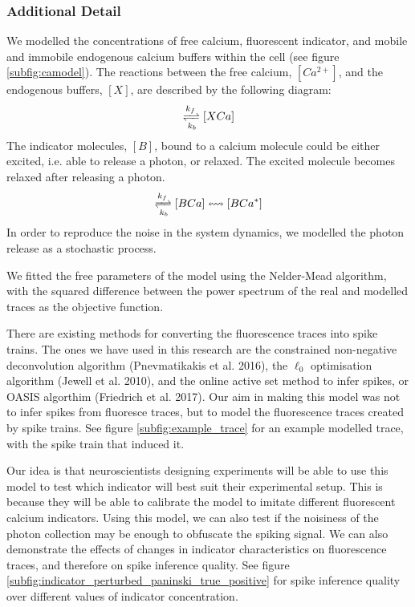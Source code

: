 \documentclass[a4paper,12pt]{article}
\theoremstyle{definition}
\begin{document}

\subsubsection*{Additional Detail}
We modelled the concentrations of free calcium, fluorescent indicator, and mobile and immobile endogenous calcium buffers within the cell (see figure \ref{subfig:camodel}). The reactions between the free calcium, $[Ca^{2+}]$, and the endogenous buffers, $[X]$, are described by the following diagram:
\begin{equation*}
   [X][Ca^{2+}] \xrightleftharpoons[k_b]{k_f} [XCa]
\end{equation*}
The indicator molecules, $[B]$, bound to a calcium molecule could be either excited, i.e. able to release a photon, or relaxed. The excited molecule becomes relaxed after releasing a photon.
\begin{equation*}
   [B][Ca^{2+}] \xrightleftharpoons[k_{b}]{k_{f}} [BCa] \leftrightsquigarrow [BCa^{*}]
\end{equation*}
In order to reproduce the noise in the system dynamics, we modelled the photon release as a stochastic process.

We fitted the free parameters of the model using the Nelder-Mead algorithm, with the squared difference between the power spectrum of the real and modelled traces as the objective function.

There are existing methods for converting the fluorescence traces into spike trains. The ones we have used in this research are the constrained non-negative deconvolution algorithm (Pnevmatikakis et al. 2016), the $\ell_0$ optimisation algorithm (Jewell et al. 2010), and the online active set method to infer spikes, or OASIS algorthim (Friedrich et al. 2017). Our aim in making this model was not to infer spikes from fluoresce traces, but to model the fluorescence traces created by spike trains. See figure \ref{subfig:example_trace} for an example modelled trace, with the spike train that induced it.

Our idea is that neuroscientists designing experiments will be able to use this model to test which indicator will best suit their experimental setup. This is because they will be able to calibrate the model to imitate different fluorescent calcium indicators. Using this model, we can also test if the noisiness of the photon collection may be enough to obfuscate the spiking signal. We can also demonstrate the effects of changes in indicator characteristics on fluorescence traces, and therefore on spike inference quality. See figure \ref{subfig:indicator_perturbed_paninski_true_positive} for spike inference quality over different values of indicator concentration.
\end{document}
